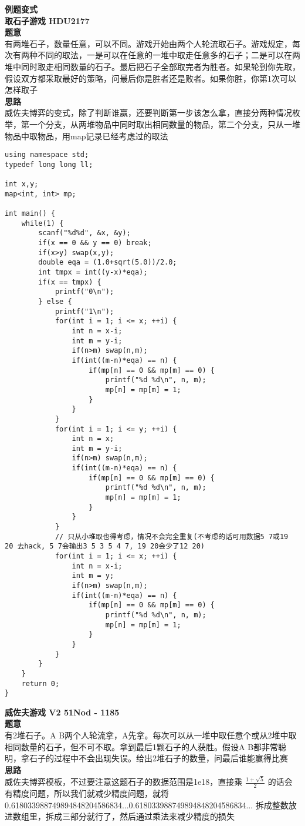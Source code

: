 \textbf{例题变式}\\
\textbf{取石子游戏 HDU2177}\\
\textbf{题意}\\
有两堆石子，数量任意，可以不同。游戏开始由两个人轮流取石子。游戏规定，每次有两种不同的取法，一是可以在任意的一堆中取走任意多的石子；二是可以在两堆中同时取走相同数量的石子。最后把石子全部取完者为胜者。如果轮到你先取，假设双方都采取最好的策略，问最后你是胜者还是败者。如果你胜，你第1次可以怎样取子\\
\textbf{思路}\\
威佐夫博弈的变式，除了判断谁赢，还要判断第一步该怎么拿，直接分两种情况枚举，第一个分支，从两堆物品中同时取出相同数量的物品，第二个分支，只从一堆物品中取物品，用map记录已经考虑过的取法\\
\begin{lstlisting}
using namespace std;
typedef long long ll;

int x,y;
map<int, int> mp;

int main() {
	while(1) {
		scanf("%d%d", &x, &y);
		if(x == 0 && y == 0) break;
		if(x>y) swap(x,y);
		double eqa = (1.0+sqrt(5.0))/2.0;
		int tmpx = int((y-x)*eqa);
		if(x == tmpx) {
			printf("0\n");
		} else {
			printf("1\n");
			for(int i = 1; i <= x; ++i) {
				int n = x-i;
				int m = y-i;
				if(n>m) swap(n,m);
				if(int((m-n)*eqa) == n) {
					if(mp[n] == 0 && mp[m] == 0) {
						printf("%d %d\n", n, m);
						mp[n] = mp[m] = 1;
					}
				}
			}
			for(int i = 1; i <= y; ++i) {
				int n = x;
				int m = y-i;
				if(n>m) swap(n,m);
				if(int((m-n)*eqa) == n) {
					if(mp[n] == 0 && mp[m] == 0) {
						printf("%d %d\n", n, m);
						mp[n] = mp[m] = 1;
					}
				}
			}
			// 只从小堆取也得考虑，情况不会完全重复(不考虑的话可用数据5 7或19 20 去hack, 5 7会输出3 5 3 5 4 7, 19 20会少了12 20) 
			for(int i = 1; i <= x; ++i) {
				int n = x-i;
				int m = y;
				if(n>m) swap(n,m);
				if(int((m-n)*eqa) == n) {
					if(mp[n] == 0 && mp[m] == 0) {
						printf("%d %d\n", n, m);
						mp[n] = mp[m] = 1;
					}
				}
			}
		}
	}
	return 0;
}
\end{lstlisting}

\textbf{威佐夫游戏 V2 51Nod - 1185} \\
\textbf{题意}\\
有2堆石子。A B两个人轮流拿，A先拿。每次可以从一堆中取任意个或从2堆中取相同数量的石子，但不可不取。拿到最后1颗石子的人获胜。假设A B都非常聪明，拿石子的过程中不会出现失误。给出2堆石子的数量，问最后谁能赢得比赛\\
\textbf{思路}\\
威佐夫博弈模板，不过要注意这题石子的数据范围是1e18，直接乘 $ \frac{1+\sqrt{5}}{2} $ 的话会有精度问题，所以我们就减少精度问题，就将0.618033988749894848204586834...0.618033988749894848204586834... 拆成整数放进数组里，拆成三部分就行了，然后通过乘法来减少精度的损失\\

